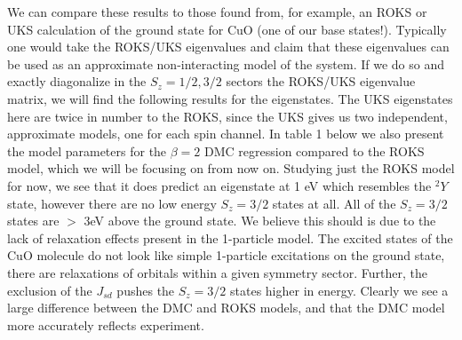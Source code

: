 \documentclass{article}
\begin{document}
We can compare these results to those found from, for example, an ROKS or UKS calculation of the ground state for CuO (one of our base states!). Typically one would take the ROKS/UKS eigenvalues and claim that these eigenvalues can be used as an approximate non-interacting model of the system. If we do so and exactly diagonalize in the $S_z=1/2,3/2$ sectors the ROKS/UKS eigenvalue matrix, we will find the following results for the eigenstates. The UKS eigenstates here are twice in number to the ROKS, since the UKS gives us two independent, approximate models, one for each spin channel. In table 1 below we also present the model parameters for the $\beta=2$ DMC regression compared to the ROKS model, which we will be focusing on from now on. Studying just the ROKS model for now, we see that it does predict an eigenstate at 1 eV which resembles the $^2Y$ state, however there are no low energy $S_z=3/2$ states at all. All of the $S_z=3/2$ states are $>$ 3eV above the ground state. We believe this should is due to the lack of relaxation effects present in the 1-particle model. The excited states of the CuO molecule do not look like simple 1-particle excitations on the ground state, there are relaxations of orbitals within a given symmetry sector. Further, the exclusion of the $J_{sd}$ pushes the $S_z=3/2$ states higher in energy. Clearly we see a large difference between the DMC and ROKS models, and that the DMC model more accurately reflects experiment. 
\end{document}
